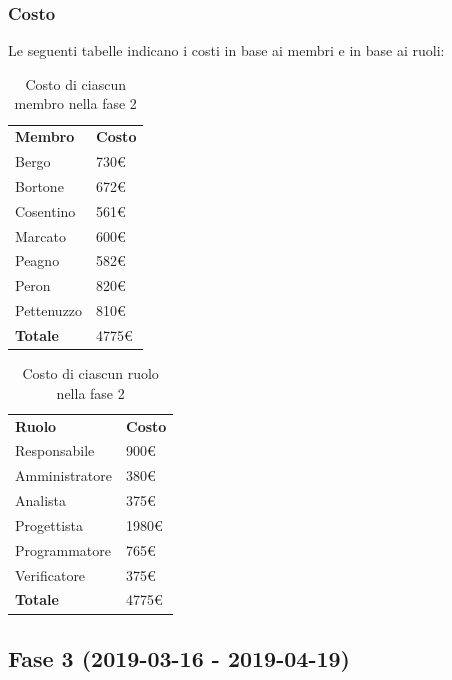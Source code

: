 	\subsubsection{Costo}
		Le seguenti tabelle indicano i costi in base ai membri e in base ai ruoli:	
		\begin{table}[H]
			\centering
			\begin{tabular}{| l | l |}
				\rowcolor{LightBlue}
				\textbf{\color{white}Membro}
				& \textbf{\color{white}Costo}\\
			
				Bergo				& 730€\\
				Bortone			& 672€\\
				Cosentino		& 561€\\
				Marcato			& 600€\\
				Peagno				& 582€\\
				Peron				& 820€\\
				Pettenuzzo		& 810€\\ \hline
				\textbf{Totale} & 4775€\\ \hline
			\end{tabular}
			\caption{Costo di ciascun membro nella fase 2}
		\end{table}
		
		\begin{table}[H]
			\centering
			\begin{tabular}{| l | l |}
				\rowcolor{LightBlue}
				\textbf{\color{white}Ruolo}
				& \textbf{\color{white}Costo}\\
			
				Responsabile 		& 900€\\
				Amministratore 	& 380€\\
				Analista 				& 375€\\			
				Progettista 			& 1980€\\
				Programmatore 		& 765€\\
				Verificatore 		& 375€\\ \hline
				\textbf{Totale} 	& 4775€\\ \hline
			\end{tabular}		
			\caption{Costo di ciascun ruolo nella fase 2}
		\end{table}
		
\subsection{Fase 3 (2019-03-16 - 2019-04-19)}
